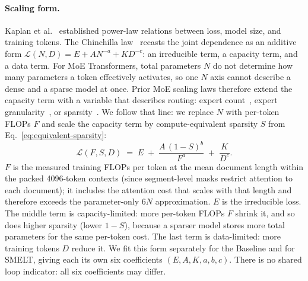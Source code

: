 \documentclass[]{bytedance_seed}
\newcommand{\archname}{SMELT}
\theoremstyle{definition}
\theoremstyle{remark}
\begin{document}
\paragraph{Scaling form.}
Kaplan et al.~\cite{kaplan2020scaling} established power-law relations between loss, model size, and training tokens.
%
The Chinchilla law~\cite{hoffmann2022training} recasts the joint dependence as an additive form
$\mathcal{L}(N, D) = E + A N^{-a} + K D^{-c}$: an irreducible term, a capacity term, and a data term.
%
%
For MoE Transformers, total parameters $N$ do not determine how many parameters a token effectively activates, so one $N$ axis cannot describe a dense and a sparse model at once.
%
Prior MoE scaling laws therefore extend the capacity term with a variable that describes routing: expert count~\cite{clark2022unified}, expert granularity~\cite{ludziejewski2024scaling}, or sparsity~\cite{abnar2025parameters}.
%
We follow that line: we replace $N$ with per-token FLOPs $F$ and scale the capacity term by compute-equivalent sparsity $S$ from Eq.~\ref{eq:equivalent-sparsity}:
%
\begin{equation}
\label{eq:separate-surface}
\mathcal{L}(F, S, D)
\;=\;
E
\;+\;
\frac{A\,(1-S)^{b}}
{F^{a}}
\;+\;
\frac{K}{D^{c}}.
\end{equation}
%
$F$ is the measured training FLOPs per token at the mean document length within the packed 4096-token contexts (since segment-level masks restrict attention to each document); it includes the attention cost that scales with that length and therefore exceeds the parameter-only $6N$ approximation.
%
$E$ is the irreducible loss.
%
The middle term is capacity-limited: more per-token FLOPs $F$ shrink it, and so does higher sparsity (lower $1{-}S$), because a sparser model stores more total parameters for the same per-token cost.
%
The last term is data-limited: more training tokens $D$ reduce it.
%
We fit this form separately for the Baseline and for \archname{}, giving each its own six coefficients $(E, A, K, a, b, c)$.
%
There is no shared loop indicator: all six coefficients may differ.
%
\end{document}
